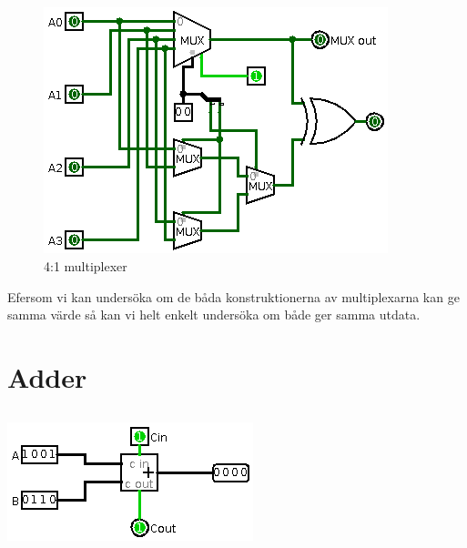 \documentclass[11pt]{article}
\begin{document}
\subsection{}
\label{sec:orgheadline5}
\begin{figure}[htb]
\centering
\includegraphics[width=.9\linewidth]{./assignment2.png}
\caption{4:1 multiplexer}
\end{figure}
Efersom vi kan undersöka om de båda konstruktionerna av multiplexarna kan ge samma värde så kan vi helt enkelt undersöka om både ger samma utdata. 


\section{Adder}
\label{sec:orgheadline9}

\subsection{}
\label{sec:orgheadline7}

\includegraphics[width=.9\linewidth]{./Assignment3-1.png}


\subsection{}
\label{sec:orgheadline8}
\end{document}
